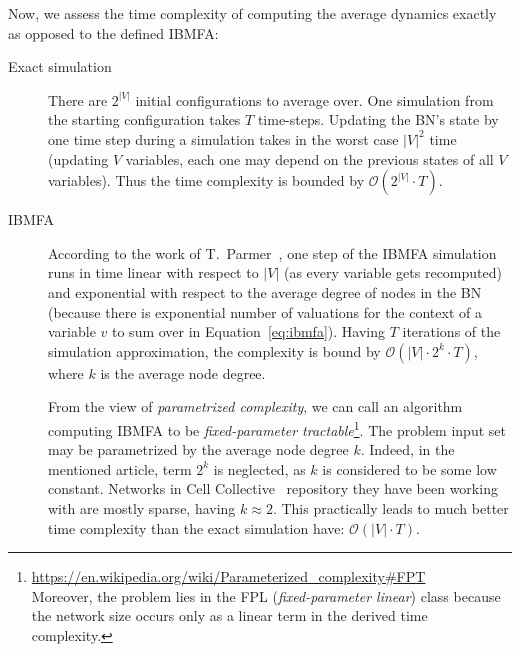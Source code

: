 \documentclass[
	digital, oneside, nosansbold, nocolorbold, nolot, nolof
]{fithesis4}
\theoremstyle{definition}
\theoremstyle{definition}
\begin{document}
Now, we assess the time complexity of computing the average dynamics exactly
as opposed to the defined IBMFA:
\begin{description}
    \item[Exact simulation] There are $2^{|V|}$ initial configurations to
        average over. One simulation from the starting configuration
        takes $T$ time-steps.
        Updating the BN's state by one time step during a simulation takes
        in the worst case $|V|^2$ time (updating $V$ variables, each one may
        depend on the previous states of all $V$ variables). Thus the time
        complexity is bounded by $\mathcal{O}(2^{|V|} \cdot T)$.
    \item[IBMFA] According to the work of T.~Parmer~\cite{infl_max_BN},
        one step of the IBMFA simulation runs in time linear with respect to
        $|V|$ (as every variable gets recomputed) and exponential with respect
        to the average degree of nodes in the BN (because there is exponential
        number of valuations for the context of a variable $v$ to sum over
        in Equation~\ref{eq:ibmfa}). Having $T$ iterations of the simulation
        approximation, the complexity is bound by $\mathcal{O}(|V| \cdot 2^k
        \cdot T)$, where $k$ is the average node degree.

        From the view of \emph{parametrized complexity}, we can call an
        algorithm computing IBMFA to be \emph{fixed-parameter
        tractable}\footnote{\url{
        https://en.wikipedia.org/wiki/Parameterized_complexity\#FPT}\\Moreover,
        the problem lies in the FPL (\emph{fixed-parameter linear}) class
        because the network size occurs only as a linear term in the
        derived time complexity.}.  The problem input set may be parametrized
        by the average node degree $k$.  Indeed, in the mentioned article, term
        $2^k$ is neglected, as $k$ is considered to be some low constant.
        Networks in Cell Collective~\cite{cell_collective} repository they have
        been working with are mostly sparse, having $k \approx 2$. This
        practically leads to much better time complexity than the exact
        simulation have: $\mathcal{O}(|V| \cdot T)$.
\end{description}
\end{document}
